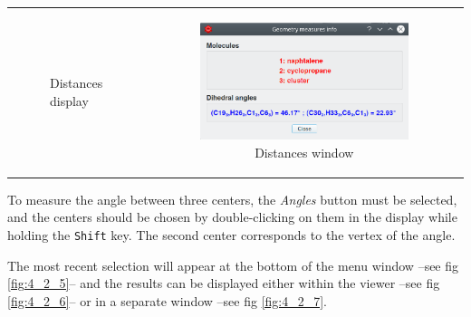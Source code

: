 \documentclass[10pt]{article}
\begin{document}
\begin{tabular}{lcr}
\begin{minipage}{.45\linewidth}
\begin{figure}[H]
\begin{center}
        \end{center}
        \vspace*{-2mm}
        \caption{Distances display \label{fig:4_2_3}}
    \end{figure}
\end{minipage}
&
\begin{minipage}{.25\linewidth}
    \begin{figure}[H]
        \begin{center}
            \vspace*{0mm}
            \includegraphics[width=0.9\linewidth]{damqt320_distances_3.png}
        \end{center}
        \vspace*{16mm}
        \caption{Distances window \label{fig:4_2_4}}
    \end{figure}
\end{minipage}
\end{tabular}
\vspace*{5mm}

To measure the angle between three centers, the {\it Angles}  
button must be selected, and the centers should be chosen by double-clicking on them  
in the display while holding the \texttt{Shift} key. The second center corresponds  
to the vertex of the angle.  

The most recent selection will appear at the bottom of the menu window --see fig \ref{fig:4_2_5}--  
and the results can be displayed either within the viewer --see fig \ref{fig:4_2_6}--  
or in a separate window --see fig \ref{fig:4_2_7}.  


\vspace*{0.5cm}
\end{document}
